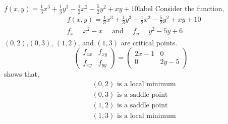 \begin{ex}{$f(x, y)=\frac{1}{3} x^3+\frac{1}{3} y^3-\frac{1}{2} x^2-\frac{5}{2} y^2+x y+10$}{label}
Consider the function,
\begin{align*}
&f(x, y)=\frac{1}{3} x^3+\frac{1}{3} y^3-\frac{1}{2} x^2-\frac{5}{2} y^2+x y+10\\
&f_x=x^2-x \quad \text{ and } \quad f_y=y^2-5 y+6
\end{align*}
$(0,2)$,$(0,3)$, $(1,2)$, and $(1,3)$ are critical points.
\[\left(\begin{array}{ll}
f_{x x} & f_{x y} \\
f_{x y} & f_{y y}
\end{array}\right)=\left(\begin{array}{cc}
2 x-1 & 0 \\
0 & 2 y-5
\end{array}\right)\]
shows that,
\begin{align*}
    &(0,2) \text{ is a local minimum} \\
    &(0,3) \text{ is a saddle point} \\
    &(1,2) \text{ is a saddle point} \\
    &(1,3) \text{ is a local minimum}
\end{align*}
\end{ex}